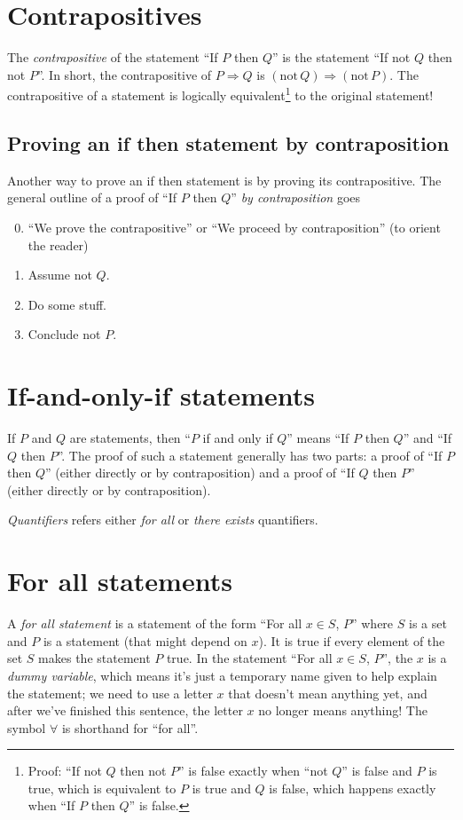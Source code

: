 \documentclass[12pt]{amsart}
\begin{document}
\section*{Contrapositives} The \emph{contrapositive} of the statement  ``If $P$ then $Q$'' is the statement  ``If not $Q$ then not $P$''. In short, the contrapositive of $P \Rightarrow Q$ is $(\mathrm{not}\, Q) \Rightarrow  (\mathrm{not}\, P)$. The contrapositive of a statement is logically equivalent\footnote{Proof:  ``If not $Q$ then not $P$'' is false exactly when ``not $Q$'' is false and $P$ is true, which is equivalent to $P$ is true and $Q$ is false, which happens exactly when ``If $P$ then $Q$'' is false.} to the original statement!

\subsection*{Proving an if then statement by contraposition} Another way to prove an if then statement is by proving its contrapositive. The general outline of a proof of ``If $P$ then $Q$'' \emph{by contraposition} goes
\begin{enumerate}\setcounter{enumi}{-1}
\item ``We prove the contrapositive'' or ``We proceed by contraposition'' (to orient the reader)
\item Assume not $Q$.
\item Do some stuff.
\item Conclude not $P$.
\end{enumerate}

\section*{If-and-only-if statements}
If $P$ and $Q$ are statements, then ``$P$ if and only if $Q$'' means ``If $P$ then $Q$'' and ``If $Q$ then $P$''. The proof of such a statement generally has two parts: a proof of ``If $P$ then $Q$'' (either directly or by contraposition) and a proof of ``If $Q$ then $P$'' (either directly or by contraposition).

\newpage

\emph{Quantifiers} refers either \emph{for all} or \emph{there exists} quantifiers.

\section*{For all statements} A \emph{for all statement} is a statement of the form ``For all $x\in S$, $P$'' where $S$ is a set and $P$ is a statement (that might depend on $x$). It is true if every element of the set $S$ makes the statement $P$ true. In the statement ``For all $x\in S$, $P$'', the $x$ is a \emph{dummy variable}, which means it's just a temporary name given to help explain the statement; we need to use a letter $x$ that doesn't mean anything yet, and after we've finished this sentence, the letter $x$ no longer means anything! The symbol $\forall$ is shorthand for ``for all''.
\end{document}
